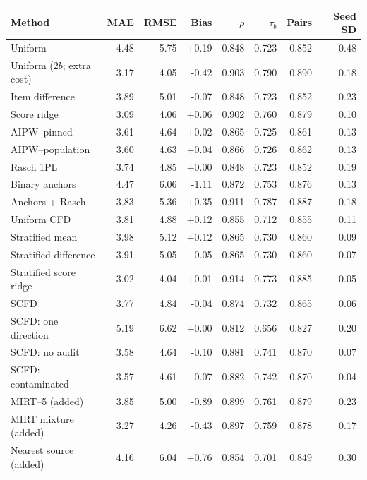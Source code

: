 \begin{tabular}{lrrrrrrr}
\toprule
Method & MAE & RMSE & Bias & $\rho$ & $\tau_b$ & Pairs & Seed SD \\
\midrule
Uniform & 4.48 & 5.75 & +0.19 & 0.848 & 0.723 & 0.852 & 0.48 \\
Uniform ($2b$; extra cost) & 3.17 & 4.05 & -0.42 & 0.903 & 0.790 & 0.890 & 0.18 \\
Item difference & 3.89 & 5.01 & -0.07 & 0.848 & 0.723 & 0.852 & 0.23 \\
Score ridge & 3.09 & 4.06 & +0.06 & 0.902 & 0.760 & 0.879 & 0.10 \\
AIPW--pinned & 3.61 & 4.64 & +0.02 & 0.865 & 0.725 & 0.861 & 0.13 \\
AIPW--population & 3.60 & 4.63 & +0.04 & 0.866 & 0.726 & 0.862 & 0.13 \\
Rasch 1PL & 3.74 & 4.85 & +0.00 & 0.848 & 0.723 & 0.852 & 0.19 \\
Binary anchors & 4.47 & 6.06 & -1.11 & 0.872 & 0.753 & 0.876 & 0.13 \\
Anchors + Rasch & 3.83 & 5.36 & +0.35 & 0.911 & 0.787 & 0.887 & 0.18 \\
Uniform CFD & 3.81 & 4.88 & +0.12 & 0.855 & 0.712 & 0.855 & 0.11 \\
Stratified mean & 3.98 & 5.12 & +0.12 & 0.865 & 0.730 & 0.860 & 0.09 \\
Stratified difference & 3.91 & 5.05 & -0.05 & 0.865 & 0.730 & 0.860 & 0.07 \\
Stratified score ridge & 3.02 & 4.04 & +0.01 & 0.914 & 0.773 & 0.885 & 0.05 \\
SCFD & 3.77 & 4.84 & -0.04 & 0.874 & 0.732 & 0.865 & 0.06 \\
SCFD: one direction & 5.19 & 6.62 & +0.00 & 0.812 & 0.656 & 0.827 & 0.20 \\
SCFD: no audit & 3.58 & 4.64 & -0.10 & 0.881 & 0.741 & 0.870 & 0.07 \\
SCFD: contaminated & 3.57 & 4.61 & -0.07 & 0.882 & 0.742 & 0.870 & 0.04 \\
MIRT--5 (added) & 3.85 & 5.00 & -0.89 & 0.899 & 0.761 & 0.879 & 0.23 \\
MIRT mixture (added) & 3.27 & 4.26 & -0.43 & 0.897 & 0.759 & 0.878 & 0.17 \\
Nearest source (added) & 4.16 & 6.04 & +0.76 & 0.854 & 0.701 & 0.849 & 0.30 \\
\bottomrule
\end{tabular}
